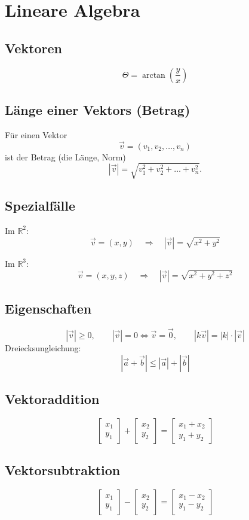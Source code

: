 \documentclass[10pt,a4paper,twocolumn]{article}
\newcommand{\seccol}{black}
\newcommand{\setseccol}[1]{\renewcommand{\seccol}{#1}}
\begin{document}
	\setseccol{c2}
	\section{Lineare Algebra}
	\subsection{Vektoren}
	$$\Theta = \arctan(\frac{y}{x})$$
	\subsection{Länge einer Vektors (Betrag)}
	
	Für einen Vektor 
	\[
	\vec{v} = (v_1, v_2, \dots, v_n)
	\]
	ist der Betrag (die Länge, Norm)
	\[
	|\vec{v}| = \sqrt{v_1^2 + v_2^2 + \dots + v_n^2}.
	\]
	
	\subsection*{Spezialfälle}
	Im $\mathbb{R}^2$:
	\[
	\vec{v}=(x,y) \quad\Rightarrow\quad |\vec{v}|=\sqrt{x^2+y^2}
	\]
	
	Im $\mathbb{R}^3$:
	\[
	\vec{v}=(x,y,z) \quad\Rightarrow\quad |\vec{v}|=\sqrt{x^2+y^2+z^2}
	\]
	
	\subsection*{Eigenschaften}
	\[
	|\vec{v}| \ge 0,\qquad
	|\vec{v}| = 0 \Leftrightarrow \vec{v} = \vec{0},\qquad
	|k\vec{v}| = |k|\cdot|\vec{v}|
	\]
	Dreiecksungleichung:
	\[
	|\vec{a}+\vec{b}| \le |\vec{a}| + |\vec{b}|
	\]
	
	
	\subsection{Vektoraddition}
	$$\begin{bmatrix} x_1 \\ y_1 \end{bmatrix} + \begin{bmatrix} x_2 \\ y_2 \end{bmatrix} = \begin{bmatrix} x_1 + x_2 \\ y_1 + y_2\end{bmatrix}$$
	\subsection{Vektorsubtraktion}
	$$\begin{bmatrix} x_1 \\ y_1 \end{bmatrix} - \begin{bmatrix} x_2 \\ y_2 \end{bmatrix} = \begin{bmatrix} x_1 - x_2 \\ y_1 - y_2\end{bmatrix}$$
\end{document}

